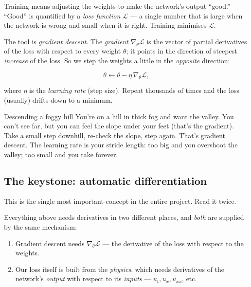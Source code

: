 \documentclass[11pt,a4paper]{article}
\begin{document}
Training means adjusting the weights to make the network's output ``good.''
``Good'' is quantified by a \emph{loss function} $\mathcal{L}$ --- a single
number that is large when the network is wrong and small when it is right.
Training minimises $\mathcal{L}$.

The tool is \emph{gradient descent}. The \emph{gradient}
$\nabla_\theta \mathcal{L}$ is the vector of partial derivatives of the loss
with respect to every weight $\theta$; it points in the direction of steepest
\emph{increase} of the loss. So we step the weights a little in the
\emph{opposite} direction:

\begin{equation}
\theta \leftarrow \theta - \eta \, \nabla_\theta \mathcal{L},
\end{equation}

where $\eta$ is the \emph{learning rate} (step size). Repeat thousands of times
and the loss (usually) drifts down to a minimum.

\begin{intuitionbox}{Descending a foggy hill}
You're on a hill in thick fog and want the valley. You can't see far, but you
can feel the slope under your feet (that's the gradient). Take a small step
downhill, re-check the slope, step again. That's gradient descent. The learning
rate is your stride length: too big and you overshoot the valley; too small and
you take forever.
\end{intuitionbox}

\subsection{The keystone: automatic differentiation}
\label{sec:autodiff}

This is the single most important concept in the entire project. Read it twice.

Everything above needs derivatives in two different places, and \emph{both} are
supplied by the same mechanism:

\begin{enumerate}[leftmargin=2em]
  \item Gradient descent needs $\nabla_\theta \mathcal{L}$ --- the derivative of
        the loss with respect to the weights.
  \item Our loss itself is built from the \emph{physics}, which needs
        derivatives of the network's \emph{output} with respect to its
        \emph{inputs} --- $u_t, u_x, u_{xx}$, etc.
\end{enumerate}
\end{document}

